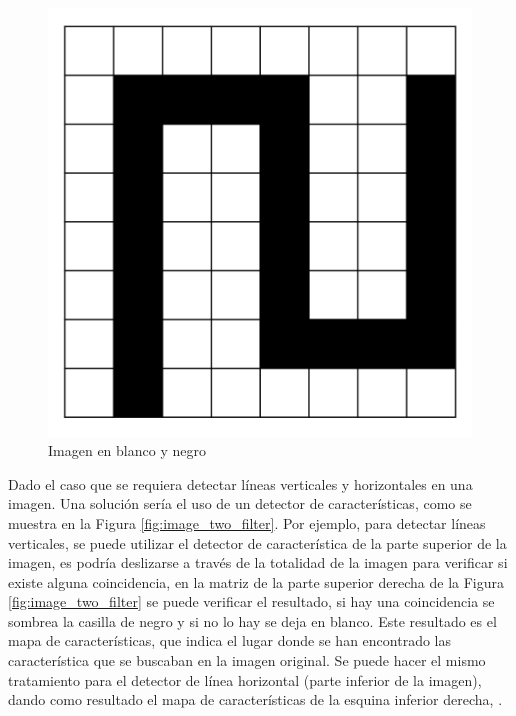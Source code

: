     \begin{figure}[htp]
        \centering
        \includegraphics[scale=0.23]{chapter3/image_no_filter.png}
        \caption{Imagen en blanco y negro}
        \label{fig:image_no_filter}
    \end{figure}
    Dado el caso que se requiera detectar líneas verticales y horizontales en una imagen. Una solución sería el uso de un detector de características, como se muestra en la Figura \ref{fig:image_two_filter}. Por ejemplo, para detectar líneas verticales, se puede utilizar el detector de característica de la parte superior de la imagen, es podría deslizarse a través de la totalidad de la imagen para verificar si existe alguna coincidencia, en la matriz de la parte superior derecha de la Figura \ref{fig:image_two_filter} se puede verificar el resultado, si hay una coincidencia se sombrea la casilla de negro y si no lo hay se deja en blanco. Este resultado es el mapa de características, que indica el lugar donde se han encontrado las característica que se buscaban en la imagen original. Se puede hacer el mismo tratamiento para el detector de línea horizontal (parte inferior de la imagen), dando como resultado el mapa de características de la esquina inferior derecha, \cite{NIPS2010_0550, dlBook}.
